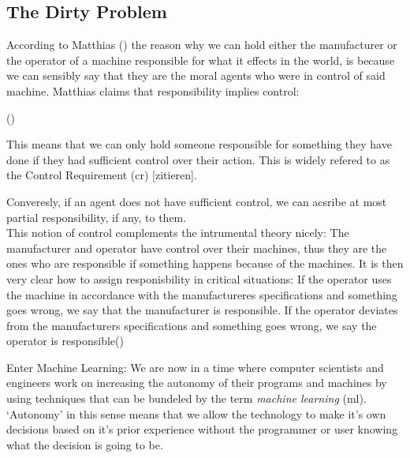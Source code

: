 \documentclass{article}
\begin{document}
\subsection{The Dirty Problem}

According to Matthias (\cite{Matthias_2004}) the reason why we can hold either the
manufacturer or the operator of a machine responsible for what it effects in the
world, is because we can sensibly say that they are the moral agents who were in
control of said machine. Matthias claims that responsibility implies control:

\vspace{.8em}
 (\cite[p.175]{Matthias_2004})

\vspace{.8em}
This means that we can only hold someone responsible for something they have
done if they had sufficient control over their action.
This is widely refered to as the Control Requirement (\acrshort{cr}) [zitieren].

Converesly, if an agent does not have sufficient control, we can acsribe at most
partial responsibility, if any, to them.\\
This notion of control complements the intrumental theory nicely: The
manufacturer and operator have control over their machines, thus they are the
ones who are responsible if something happens because of the machines.
It is then very clear how to assign responisbility in critical situations: If the operator uses the
machine in accordance with the manufactureres specifications and something goes
wrong, we say that the manufacturer is responsible. If the operator deviates
from the manufacturers specifications and something goes wrong, we say the
operator is responsible(\cite[p.175]{Matthias_2004})

Enter Machine Learning:
We are now in a time where computer scientists and engineers work on increasing
the autonomy of their programs and machines by using techniques that can be
bundeled by the term \textit{machine learning} (\acrshort{ml}). `Autonomy' in this sense
means that we allow the technology to make it's own decisions based on it's
prior experience without the programmer or user knowing what the decision is
going to be. 

\end{document}
